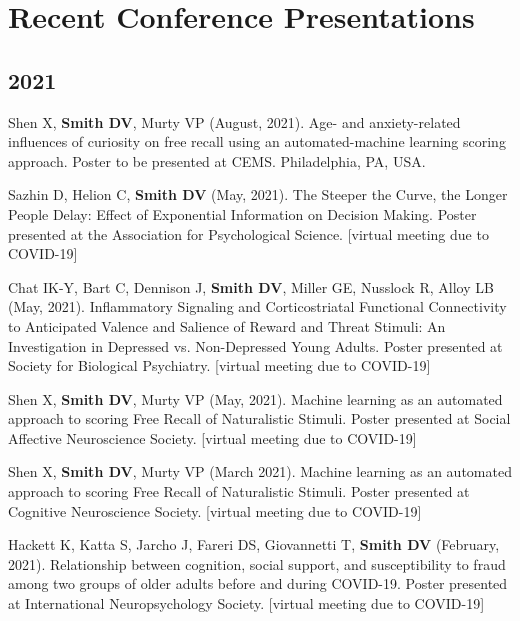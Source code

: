 \documentclass[11pt, letterpaper]{article}
\begin{document}
\section*{Recent Conference Presentations}
\label{sec:conferences}

\subsection*{2021}
\begin{hangparas}{.5in}{1}

Shen X, \textbf{Smith DV}, Murty VP (August, 2021). Age- and anxiety-related influences of curiosity on free recall using an automated-machine learning scoring approach. Poster to be presented at CEMS. Philadelphia, PA, USA.

Sazhin D, Helion C, \textbf{Smith DV} (May, 2021). The Steeper the Curve, the Longer People Delay: Effect of Exponential Information on Decision Making. Poster presented at the Association for Psychological Science. [virtual meeting due to COVID-19]

Chat IK-Y, Bart C, Dennison J, \textbf{Smith DV}, Miller GE, Nusslock R, Alloy LB (May, 2021). Inflammatory Signaling and Corticostriatal Functional Connectivity to Anticipated Valence and Salience of Reward and Threat Stimuli: An Investigation in Depressed vs. Non-Depressed Young Adults. Poster presented at Society for Biological Psychiatry. [virtual meeting due to COVID-19]

Shen X, \textbf{Smith DV}, Murty VP (May, 2021). Machine learning as an automated approach to scoring Free Recall of Naturalistic Stimuli. Poster presented at Social Affective Neuroscience Society. [virtual meeting due to COVID-19]

Shen X, \textbf{Smith DV}, Murty VP (March 2021). Machine learning as an automated approach to scoring Free Recall of Naturalistic Stimuli. Poster presented at Cognitive Neuroscience Society. [virtual meeting due to COVID-19]

Hackett K, Katta S, Jarcho J, Fareri DS, Giovannetti T, \textbf{Smith DV} (February, 2021). Relationship between cognition, social support, and susceptibility to fraud among two groups of older adults before and during COVID-19. Poster presented at International Neuropsychology Society. [virtual meeting due to COVID-19]

\end{hangparas}
\end{document}

